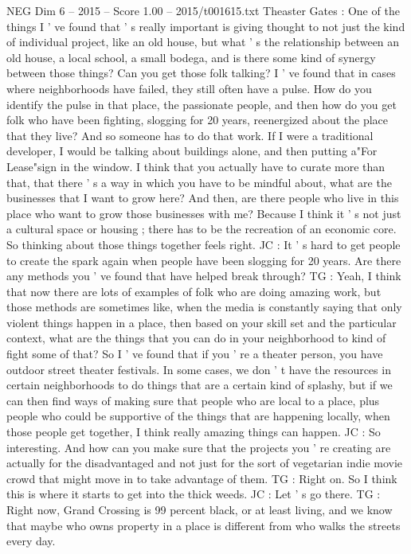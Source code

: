 \begin{textsample}{NEG Dim 6 – 2015 – Score 1.00 – 2015/t001615.txt}
Theaster Gates : One of the things I ' ve found that ' s really important is giving thought to not just the kind of individual project, like an old house, but what ' s the relationship between an old house, a local school, a small bodega, and is there some kind of synergy between those things?
Can you get those folk talking?
I ' ve found that in cases where neighborhoods have failed, they still often have a pulse.
How do you identify the pulse in that place, the passionate people, and then how do you get folk who have been fighting, slogging for 20 years, reenergized about the place that they live?
And so someone has to do that work.
If I were a traditional developer, I would be talking about buildings alone, and then putting a"For Lease"sign in the window.
I think that you actually have to curate more than that, that there ' s a way in which you have to be mindful about, what are the businesses that I want to grow here?
And then, are there people who live in this place who want to grow those businesses with me?
Because I think it ' s not just a cultural space or housing ; there has to be the recreation of an economic core.
So thinking about those things together feels right.
JC : It ' s hard to get people to create the spark again when people have been slogging for 20 years.
Are there any methods you ' ve found that have helped break through?
TG : Yeah, I think that now there are lots of examples of folk who are doing amazing work, but those methods are sometimes like, when the media is constantly saying that only violent things happen in a place, then based on your skill set and the particular context, what are the things that you can do in your neighborhood to kind of fight some of that?
So I ' ve found that if you ' re a theater person, you have outdoor street theater festivals.
In some cases, we don ' t have the resources in certain neighborhoods to do things that are a certain kind of splashy, but if we can then find ways of making sure that people who are local to a place, plus people who could be supportive of the things that are happening locally, when those people get together, I think really amazing things can happen.
JC : So interesting.
And how can you make sure that the projects you ' re creating are actually for the disadvantaged and not just for the sort of vegetarian indie movie crowd that might move in to take advantage of them.
TG : Right on.
So I think this is where it starts to get into the thick weeds.
JC : Let ' s go there.
TG : Right now, Grand Crossing is 99 percent black, or at least living, and we know that maybe who owns property in a place is different from who walks the streets every day.

\end{textsample}
